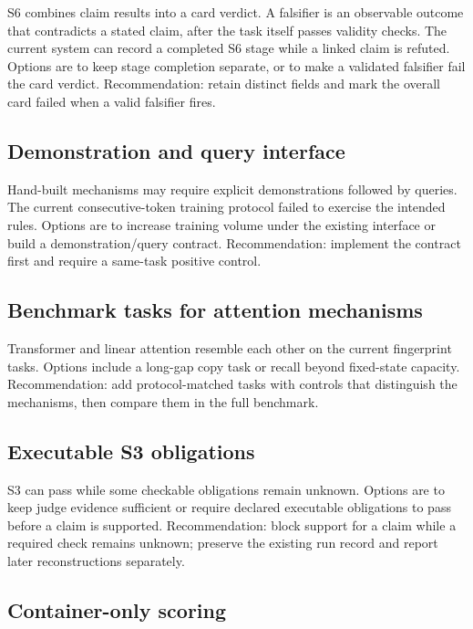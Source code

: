 S6 combines claim results into a card verdict. A falsifier is an observable outcome that contradicts a stated claim, after the task itself passes validity checks. The current system can record a completed S6 stage while a linked claim is refuted. Options are to keep stage completion separate, or to make a validated falsifier fail the card verdict. Recommendation: retain distinct fields and mark the overall card failed when a valid falsifier fires.

\subsection{Demonstration and query interface}

Hand-built mechanisms may require explicit demonstrations followed by queries. The current consecutive-token training protocol failed to exercise the intended rules. Options are to increase training volume under the existing interface or build a demonstration/query contract. Recommendation: implement the contract first and require a same-task positive control.

\subsection{Benchmark tasks for attention mechanisms}

Transformer and linear attention resemble each other on the current fingerprint tasks. Options include a long-gap copy task or recall beyond fixed-state capacity. Recommendation: add protocol-matched tasks with controls that distinguish the mechanisms, then compare them in the full benchmark.

\subsection{Executable S3 obligations}

S3 can pass while some checkable obligations remain unknown. Options are to keep judge evidence sufficient or require declared executable obligations to pass before a claim is supported. Recommendation: block support for a claim while a required check remains unknown; preserve the existing run record and report later reconstructions separately.

\subsection{Container-only scoring}

